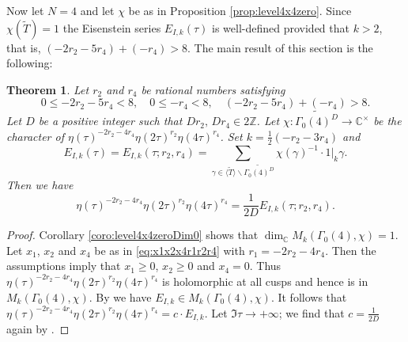 \documentclass[12pt]{amsart}
\numberwithin{equation}{section}
\theoremstyle{plain}
\newtheorem{thm}{Theorem}[section]
\theoremstyle{definition}
\theoremstyle{remark}
\newcommand\numZ{\mathbb{Z}}
\newcommand\numC{\mathbb{C}}
\newcommand\Dcover[2]{\widetilde{#1^{#2}}}
\begin{document}
Now let $N=4$ and let $\chi$ be as in Proposition \ref{prop:level4x4zero}. Since $\chi(\widetilde{T})=1$ the Eisenstein series $E_{I,k}(\tau)$ is well-defined provided that $k>2$, that is, $(-2r_2-5r_4)+(-r_4)>8$. The main result of this section is the following:
\begin{thm}
\label{thm:etaEisIdentity}
Let $r_2$ and $r_4$ be rational numbers satisfying
\begin{equation}
\label{eq:r2r4inequality}
0\leq-2r_2-5r_4<8,\quad0\leq-r_4<8,\quad(-2r_2-5r_4)+(-r_4)>8.
\end{equation}
Let $D$ be a positive integer such that $Dr_2,\,Dr_4\in2\numZ$. Let $\chi\colon\Dcover{\Gamma_0(4)}{D}\to\numC^\times$ be the character of $\eta(\tau)^{-2r_2-4r_4}\eta(2\tau)^{r_2}\eta(4\tau)^{r_4}$. Set $k=\frac{1}{2}(-r_2-3r_4)$ and
\begin{equation*}
E_{I,k}(\tau)=E_{I,k}(\tau;r_2,r_4)=\sum_{\gamma \in \langle \widetilde{T}\rangle\backslash\Dcover{\Gamma_0(4)}{D}}\chi(\gamma)^{-1}\cdot 1\vert_k\gamma.
\end{equation*}
Then we have
\begin{equation}
\label{eq:etaEis}
\eta(\tau)^{-2r_2-4r_4}\eta(2\tau)^{r_2}\eta(4\tau)^{r_4}=\frac{1}{2D}E_{I,k}(\tau;r_2,r_4).
\end{equation}
\end{thm}
\begin{proof}
Corollary \ref{coro:level4x4zeroDim0} shows that $\dim_\numC M_k(\Gamma_0(4), \chi)=1$. Let $x_1$, $x_2$ and $x_4$ be as in \eqref{eq:x1x2x4r1r2r4} with $r_1=-2r_2-4r_4$. Then the assumptions imply that $x_1\geq0$, $x_2\geq0$ and $x_4=0$. Thus $\eta(\tau)^{-2r_2-4r_4}\eta(2\tau)^{r_2}\eta(4\tau)^{r_4}$ is holomorphic at all cusps and hence is in $M_k(\Gamma_0(4), \chi)$. By \cite[Theorem 3.3]{Zhu23} we have $E_{I,k}\in M_k(\Gamma_0(4), \chi)$. It follows that $\eta(\tau)^{-2r_2-4r_4}\eta(2\tau)^{r_2}\eta(4\tau)^{r_4}=c\cdot E_{I,k}$. Let $\Im\tau\to+\infty$; we find that $c=\frac{1}{2D}$ again by \cite[Theorem 3.3]{Zhu23}.
\end{proof}
\end{document}
